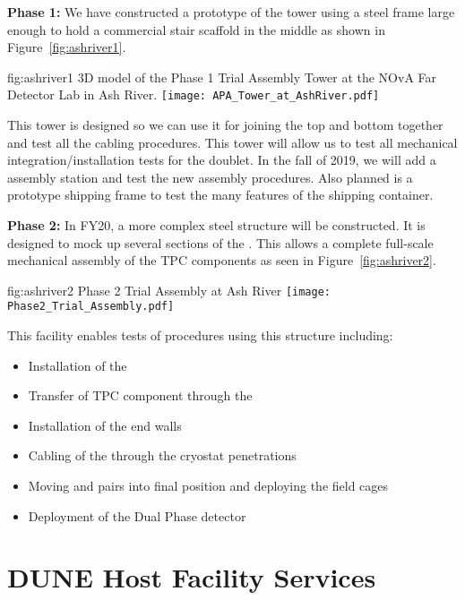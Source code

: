 {\bf Phase 1:} We have constructed a prototype of the   tower
using a steel frame large enough to hold a commercial stair scaffold
in the middle as shown in Figure~\ref{fig:ashriver1}.
\begin{dunefigure}{fig:ashriver1}
  {3D model of the Phase 1 Trial Assembly  Tower at the NOvA Far Detector
    Lab in Ash River.}
  \texttt{[image: APA\_Tower\_at\_AshRiver.pdf]}
\end{dunefigure}
This  tower is designed so we can use it for joining the
top and bottom  together and test all the cabling
procedures.  This tower will allow us to test all mechanical
integration/installation tests for the  doublet. In the
fall of 2019, we will add a  assembly station and test the
new  assembly procedures.  Also planned is a prototype
 shipping frame to test the many features of the shipping
container.

{\bf Phase 2:} In FY20, a more complex steel structure will be
constructed. It is designed to mock up several sections of the
. This allows a complete full-scale mechanical assembly of
the TPC components as seen in Figure~\ref{fig:ashriver2}.
\begin{dunefigure}{fig:ashriver2}
  {Phase 2 Trial Assembly at Ash River}
  \texttt{[image: Phase2\_Trial\_Assembly.pdf]}
\end{dunefigure}
This facility enables tests of procedures using this structure including:
\begin{itemize}
 \item Installation of the 
 \item Transfer of TPC component through the 
 \item Installation of the end walls
 \item Cabling of the  through the cryostat penetrations
 \item Moving  and  pairs into final position and deploying the field cages
 \item Deployment of the Dual Phase detector
\end{itemize}

\section{DUNE Host Facility Services}
\label{sec:fdsp-coord-host_facility_services}


